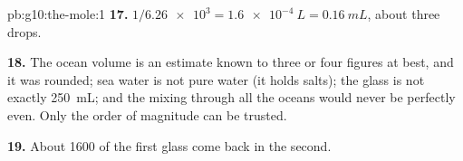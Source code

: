 \begin{solution}{pb:g10:the-mole:1}
\textbf{17.} $1 / \num{6.26e3} = \qty{1.6e-4}{L} = \qty{0.16}{mL}$, about
three drops.

\textbf{18.} The ocean volume is an estimate known to three or four
figures at best, and it was rounded; sea water is not pure water (it
holds salts); the glass is not exactly \qty{250}{mL}; and the mixing
through all the oceans would never be perfectly even. Only the order of
magnitude can be trusted.

\textbf{19.} About 1600  of the first glass come back in the
second.
\end{solution}
